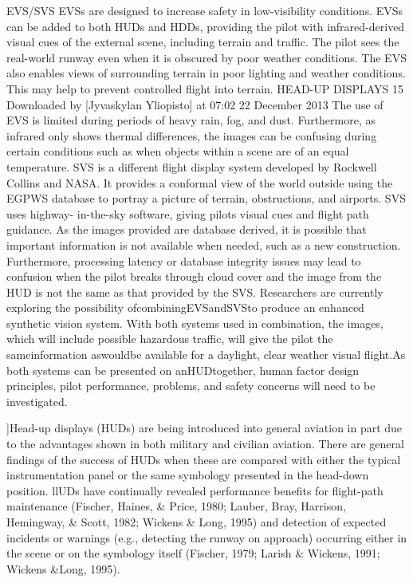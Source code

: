 \documentclass[utf8,bachelor,manualbib]{gradu3}
\begin{document}
EVS/SVS
EVSs are designed to increase safety in low-visibility conditions. EVSs can be
added to both HUDs and HDDs, providing the pilot with infrared-derived visual
cues of the external scene, including terrain and traffic. The pilot sees the
real-world runway even when it is obscured by poor weather conditions. The
EVS also enables views of surrounding terrain in poor lighting and weather conditions.
This may help to prevent controlled flight into terrain.
HEAD-UP DISPLAYS 15
Downloaded by [Jyvaskylan Yliopisto] at 07:02 22 December 2013
The use of EVS is limited during periods of heavy rain, fog, and dust. Furthermore,
as infrared only shows thermal differences, the images can be confusing during
certain conditions such as when objects within a scene are of an equal
temperature.
SVS is a different flight display system developed by Rockwell Collins and
NASA. It provides a conformal view of the world outside using the EGPWS database
to portray a picture of terrain, obstructions, and airports. SVS uses highway-
in-the-sky software, giving pilots visual cues and flight path guidance. As the
images provided are database derived, it is possible that important information is
not available when needed, such as a new construction. Furthermore, processing
latency or database integrity issues may lead to confusion when the pilot breaks
through cloud cover and the image from the HUD is not the same as that provided
by the SVS.
Researchers are currently exploring the possibility ofcombiningEVSandSVSto
produce an enhanced synthetic vision system. With both systems used in combination,
the images, which will include possible hazardous traffic, will give the pilot the
sameinformation aswouldbe available for a daylight, clear weather visual flight.As
both systems can be presented on anHUDtogether, human factor design principles,
pilot performance, problems, and safety concerns will need to be investigated. \citep{crawford2006}

]Head-up displays (HUDs) are being introduced into general aviation in part due to
the advantages shown in both military and civilian aviation. There are general
findings of the success of HUDs when these are compared with either the typical
instrumentation panel or the same symbology presented in the head-down position.
llUDs have continually revealed performance benefits for flight-path maintenance
(Fischer, Haines, \& Price, 1980; Lauber, Bray, Harrison, Hemingway, \& Scott, 1982; Wickens \& Long, 1995) and detection of expected incidents or warnings
(e.g., detecting the runway on approach) occurring either in the scene or on the
symbology itself (Fischer, 1979; Larish \& Wickens, 1991; Wickens \&Long, 1995).
\end{document}
